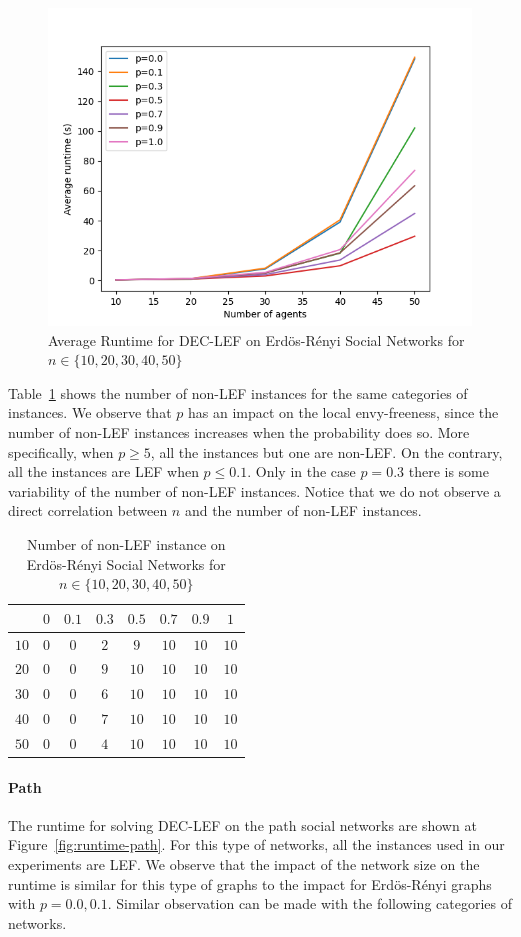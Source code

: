 \documentclass{article}
\begin{document}
\begin{figure}[htb]
\centering
\includegraphics[width=0.45\linewidth]{results-runtime-ER.png}
\caption{Average Runtime for DEC-LEF on Erd\"os-R\'enyi Social Networks for $n \in \{10,20,30,40,50\}$\label{fig:runtime-erdos-renyi}}
\end{figure}

Table~\ref{tab:non-lef-erdos-renyi} shows the number of non-LEF instances for the same categories of instances. We observe that $p$ has an impact on the local envy-freeness, since the number of non-LEF instances increases when the probability does so. More specifically, when $p \geq 5$, all the instances but one are non-LEF. On the contrary, all the instances are LEF when $p \leq 0.1$. Only in the case $p=0.3$ there is some variability of the number of non-LEF instances. Notice that we do not observe a direct correlation between $n$ and the number of non-LEF instances.

\begin{table}[htb]
\centering
\begin{tabular}{|c|c|c|c|c|c|c|c|}
	\hline
	\backslashbox{$n$}{$p$} & $0$ & $0.1$ & $0.3$ & $0.5$ & $0.7$ & $0.9$ & $1$ \\ \hline
	$10$ & $0$ & $0$ & $2$ & $9$ & $10$ & $10$ & $10$ \\
	$20$ & $0$ & $0$ & $9$ & $10$ & $10$ & $10$ & $10$ \\
	$30$ & $0$ & $0$ & $6$ & $10$ & $10$ & $10$ & $10$ \\
	$40$ & $0$ & $0$ & $7$ & $10$ & $10$ & $10$ & $10$ \\
	$50$ & $0$ & $0$ & $4$ & $10$ & $10$ & $10$ & $10$ \\
	\hline
\end{tabular}
\caption{Number of non-LEF instance on Erd\"os-R\'enyi Social Networks for $n \in \{10,20,30,40,50\}$\label{tab:non-lef-erdos-renyi}}
\end{table}

\paragraph{Path} The runtime for solving DEC-LEF on the path social networks are shown at Figure~\ref{fig:runtime-path}. For this type of networks, all the instances used in our experiments are LEF. We observe that the impact of the network size on the runtime is similar for this type of graphs to the impact for Erd\"os-R\'enyi graphs with $p = 0.0, 0.1$. Similar observation can be made with the following categories of networks.
\end{document}
